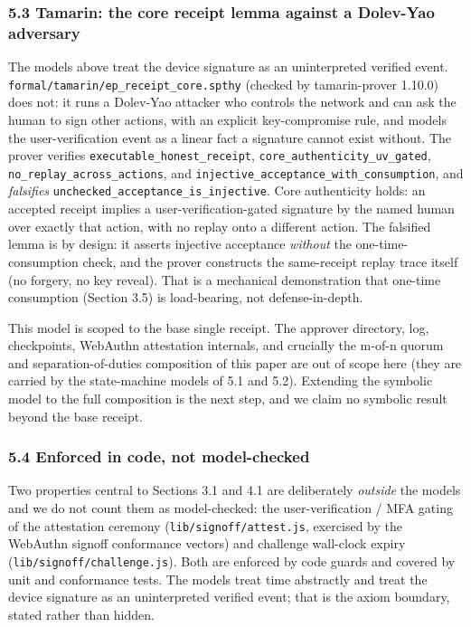 \documentclass[
  11pt,
]{article}
\begin{document}
\subsubsection{5.3 Tamarin: the core receipt lemma against a Dolev-Yao
adversary}\label{tamarin}

The models above treat the device signature as an uninterpreted verified
event. \texttt{formal/tamarin/ep\_receipt\_core.spthy} (checked by
tamarin-prover 1.10.0) does not: it runs a Dolev-Yao attacker who
controls the network and can ask the human to sign other actions, with an
explicit key-compromise rule, and models the user-verification event as a
linear fact a signature cannot exist without. The prover verifies
\texttt{executable\_honest\_receipt}, \texttt{core\_authenticity\_uv\_gated},
\texttt{no\_replay\_across\_actions}, and
\texttt{injective\_acceptance\_with\_consumption}, and \emph{falsifies}
\texttt{unchecked\_acceptance\_is\_injective}. Core authenticity holds: an
accepted receipt implies a user-verification-gated signature by the named
human over exactly that action, with no replay onto a different action.
The falsified lemma is by design: it asserts injective acceptance
\emph{without} the one-time-consumption check, and the prover constructs
the same-receipt replay trace itself (no forgery, no key reveal). That is
a mechanical demonstration that one-time consumption (Section 3.5) is
load-bearing, not defense-in-depth.

This model is scoped to the base single receipt. The approver directory,
log, checkpoints, WebAuthn attestation internals, and crucially the m-of-n
quorum and separation-of-duties composition of this paper are out of scope
here (they are carried by the state-machine models of 5.1 and 5.2).
Extending the symbolic model to the full composition is the next step,
and we claim no symbolic result beyond the base receipt.

\subsubsection{5.4 Enforced in code, not
model-checked}\label{enforced-in-code}

Two properties central to Sections 3.1 and 4.1 are deliberately
\emph{outside} the models and we do not count them as model-checked: the
user-verification / MFA gating of the attestation ceremony
(\texttt{lib/signoff/attest.js}, exercised by the WebAuthn signoff
conformance vectors) and challenge wall-clock expiry
(\texttt{lib/signoff/challenge.js}). Both are enforced by code guards
and covered by unit and conformance tests. The models treat time
abstractly and treat the device signature as an uninterpreted verified
event; that is the axiom boundary, stated rather than hidden.
\end{document}
